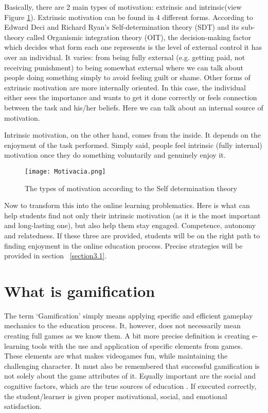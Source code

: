 \documentclass[10pt,english,a4paper]{article}
\begin{document}
	Basically, there are 2 main types of motivation: extrinsic and intrinsic(view Figure \ref{fig:motivation}). Extrinsic motivation can be found in 4 different forms. 
	According to Edward Deci and Richard Ryan's Self-determination theory (SDT) and its sub-theory called Organismic integration theory (OIT), the decision-making factor which decides what form each one represents is the level of external control it has over an individual. 
	It varies: from being fully external (e.g. getting paid, not receiving punishment) to being somewhat external where we can talk about people doing something simply to avoid feeling guilt or shame. Other forms of extrinsic motivation are more internally oriented. 
	In this case, the individual either sees the importance and wants to get it done correctly or feels connection between the task and his/her beliefs. Here we can talk about an internal source of motivation.
	
	Intrinsic motivation, on the other hand, comes from the inside. It depends on the enjoyment of the task performed. Simply said, people feel intrinsic (fully internal) motivation once they do something voluntarily and genuinely enjoy it.

	\begin{figure}[htp]
		\centering
		\texttt{[image: Motivacia.png]}
		\caption{The types of motivation according to the Self determination theory}
		\label{fig:motivation}
	\end{figure}
	

	Now to transform this into the online learning problematics. Here is what can help students find not only their intrinsic motivation (as it is the most important and long-lasting one), but also help them stay engaged. 
	Competence, autonomy and relatedness. If these three are provided, students will be on the right path to finding enjoyment in the online education process\cite{Guyan}. Precise strategies will be provided in section ~\ref{section3.1}.

\section{What is gamification} \label{section3}
	The term ‘Gamification’ simply means applying specific and efficient gameplay mechanics to the education process. It, however, does not necessarily mean creating full games as we know them\cite{Raymer}.
	A bit more precise definition is creating e-learning tools with the use and application of specific elements from games. These elements are what makes videogames fun, while maintaining the challenging character\cite{Abu-Dawood}. 
	It must also be remembered that successful gamification is not solely about the game attributes of it. Equally important are the social and cognitive factors, which are the true sources of education \cite{Raymer}.
	If executed correctly, the student/learner is given proper motivational, social, and emotional satisfaction\cite{Abu-Dawood}.
\end{document}
